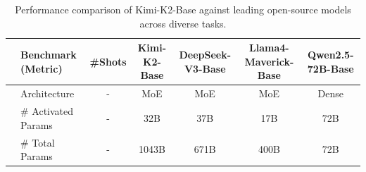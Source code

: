 \begin{table}[h]
\centering
\footnotesize
\setlength{\tabcolsep}{1.9pt}
\caption{Performance comparison of Kimi-K2-Base against leading open-source models across diverse tasks. }
\label{tab:pretrain-eval}
\begin{tabular}{@{}c l | c | c | c c c}
\toprule
& \textbf{Benchmark {\tiny (Metric)}} &  \textbf{\#Shots} &{\textbf{Kimi-K2-Base}} & \textbf{DeepSeek-V3-Base} & \textbf{Llama4-Maverick-Base}  & \textbf{Qwen2.5-72B-Base}  \\
\midrule
    \midrule
    & Architecture & - & MoE & MoE & MoE & Dense \\
    & \# Activated Params & - & 32B & 37B & 17B & 72B \\
    & \# Total Params & - & 1043B & 671B & 400B & 72B \\


\end{tabular}
\end{table}
